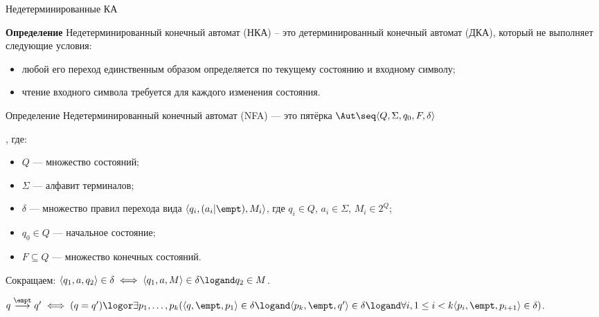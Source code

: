 \begin{frame}{Недетерминированные КА} {\vspace{-5pt}}
    \vspace{-5pt}
     {
        \begin{block}{\bf Определение}
            Недетерминированный конечный автомат (НКА) -- это детерминированный конечный автомат (ДКА), который не выполняет следующие условия:
            \begin{itemize}
                \item любой его переход единственным образом определяется по текущему состоянию и входному символу;
                \item чтение входного символа требуется для каждого изменения состояния.
            \end{itemize}
        \end{block}
    }
     {
        \begin{block}{Определение}
            Недетерминированный конечный автомат (NFA) --- это пятёрка $\Aut\seq\langle Q,\Sigma, q_0, F, \delta \rangle${, где:
                    \begin{itemize}
                        \item $Q$ --- множество состояний;
                        \item $\Sigma$ --- алфавит терминалов;
                        \item $\delta$ --- множество правил перехода вида $\langle q_i, (a_i|\empt), M_i\rangle$, где $q_i\in Q$, $a_i\in \Sigma$, $M_i\in 2^Q$;
                        \item $q_0\in Q$ --- начальное состояние;
                        \item $F\subseteq Q$ --- множество конечных состояний.
                    \end{itemize}}
        \end{block}

        Сокращаем: $\langle q_1, a, q_2\rangle\in \delta\iff \langle q_1,a,M\rangle\in\delta\logand q_2\in M$.
    }
     {
        \begin{wideitemize}
            \item $q \overset{\empt}{\longrightarrow} q'\iff (q=q')\logor\exists p_1,\dots,p_{k}(\langle q,\empt, p_1\rangle\in \delta\logand \langle p_k,\empt,q'\rangle\in\delta\logand\forall i,1\leq i<k\langle p_i,\empt,p_{i+1}\rangle\in\delta)$.


\end{wideitemize}}
\end{frame}

